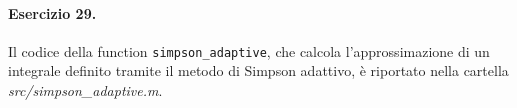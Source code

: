 \paragraph{Esercizio 29.} Il codice della function \verb|simpson_adaptive|, che calcola l'approssimazione di un integrale definito tramite il metodo di Simpson adattivo, è riportato nella cartella \emph{src/simpson\_adaptive.m}.